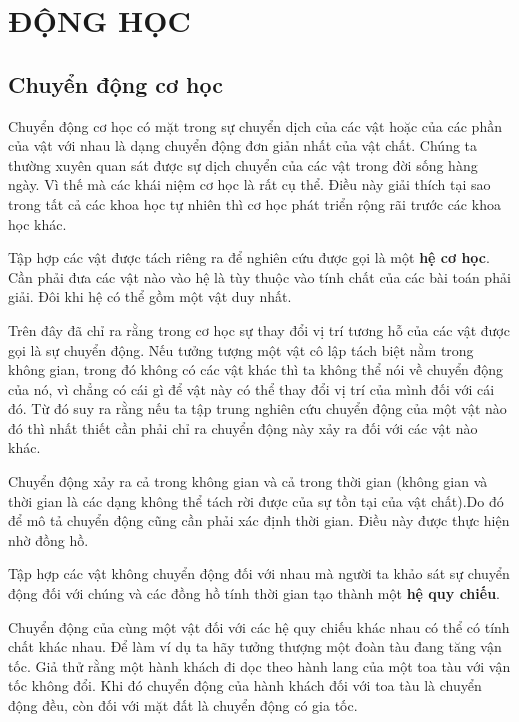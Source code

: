 

\chapter{ĐỘNG HỌC}\label{chap:1}

\section{Chuyển động cơ học}\label{sec:1_1}

Chuyển động cơ học có mặt trong sự chuyển dịch của các vật hoặc của các phần của vật với nhau là dạng chuyển động đơn giản nhất của vật chất. Chúng ta thường xuyên quan sát được sự dịch chuyển của các vật trong đời sống hàng ngày. Vì thế mà các khái niệm cơ học là rất cụ thể. Điều này giải thích tại sao trong tất cả các khoa học tự nhiên thì cơ học phát triển rộng rãi trước các khoa học khác.

Tập hợp các vật được tách riêng ra để nghiên cứu được gọi là một \textbf{hệ cơ học}. Cần phải đưa các vật nào vào hệ là tùy thuộc vào tính chất của các bài toán phải giải. Đôi khi hệ có thể gồm một vật duy nhất.

Trên đây đã chỉ ra rằng trong cơ học sự thay đổi vị trí tương hỗ của các vật được gọi là sự chuyển động. Nếu tưởng tượng một vật cô lập tách biệt nằm trong không gian, trong đó không có các vật khác thì ta không thể nói về chuyển động của nó, vì chẳng có cái gì để vật này có thể thay đổi vị trí của mình đối với cái đó. Từ đó suy ra rằng nếu ta tập trung nghiên cứu chuyển động của một vật nào đó thì nhất thiết cần phải chỉ ra chuyển động này xảy ra đối với các vật nào khác.

Chuyển động xảy ra cả trong không gian và cả trong thời gian (không gian và thời gian là các dạng không thể tách rời được của sự tồn tại của vật chất).Do đó để mô tả chuyển động cũng cần phải xác định thời gian. Điều này được thực hiện nhờ đồng hồ.

Tập hợp các vật không chuyển động đối với nhau mà người ta khảo sát sự chuyển động đối với chúng và các đồng hồ tính thời gian tạo thành một \textbf{hệ quy chiếu}.

Chuyển động của cùng một vật đối với các hệ quy chiếu khác nhau có thể có tính chất khác nhau. Để làm ví dụ ta hãy tưởng thượng một đoàn tàu đang tăng vận tốc. Giả thử rằng một hành khách đi dọc theo hành lang của một toa tàu với vận tốc không đổi. Khi đó chuyển động của hành khách đối với toa tàu là chuyển động đều, còn đối với mặt đất là chuyển động có gia tốc.

